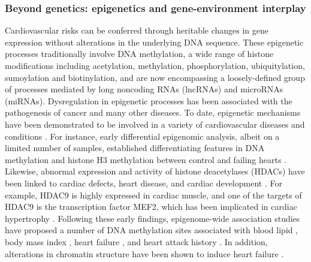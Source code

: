 \documentclass[letter]{bib}
\newcounter{example}[subsection]
\begin{document}
\subsubsection*{Beyond genetics: epigenetics and gene-environment interplay}	
	Cardiovascular risks can be conferred through heritable changes in gene expression without alterations in the underlying DNA sequence.  These epigenetic processes traditionally involve DNA methylation, a wide range of histone modifications including acetylation, methylation, phosphorylation, ubiquitylation, sumoylation and biotinylation, and are now encompassing a loosely-defined group of processes mediated by long noncoding RNAs (lncRNAs) and microRNAs (miRNAs). Dysregulation in epigenetic processes has been associated with the pathogenesis of cancer and many other diseases. To date, epigenetic mechanisms have been demonstrated to be involved in a variety of cardiovascular diseases and conditions \citep{Udali:2013:Cardiovascular,AbiKhalil:2014:emerging,Muka:2016:role,Gidlof:2016:Ischemic}.
	For instance, early differential epigenomic analysis, albeit on a limited number of samples, established differentiating features in DNA methylation and histone H3 methylation between control and failing hearts \citep{Movassagh:2011:Distinct}.  Likewise, abnormal expression and activity of histone deacetylases (HDACs) have been linked to cardiac defects, heart disease, and cardiac development \citep{Haberland:2009:Many,Trivedi:2007:Hdac2,Chang:2004:Adult,McBurney:2003:Mammalian}.  For example, HDAC9 is highly expressed in cardiac muscle, and one of the targets of HDAC9 is the transcription factor MEF2, which has been implicated in cardiac hypertrophy \citep{Allis:2015:Epigenetics}.  Following these early findings, epigenome-wide association studies have proposed a number of DNA methylation sites associated with blood lipid \citep{Irvin:2014:Epigenomewide}, body mass index \citep{Dick:2014:DNA,Wahl:2017:Epigenomewide}, heart failure \citep{Meder:2017:EpigenomeWide}, and heart attack history \citep{Rask-Andersen:2016:Epigenomewide}. In addition, alterations in chromatin structure have been shown to induce heart failure \citep{Rosa-Garrido:2017:HighResolution}.  
	
\end{document}
